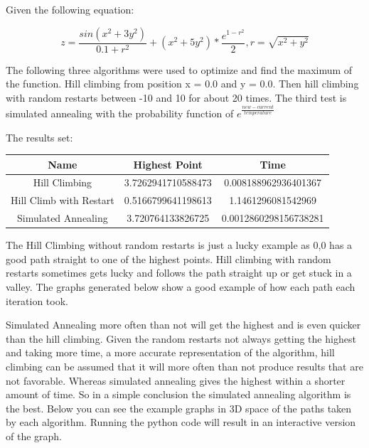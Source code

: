 \documentclass[letter,12pt]{article}
\begin{document}
\pagestyle{headings}

Given the following equation:

\begin{equation}
z = \frac{sin(x^2 + 3y^2)}{0.1+r^2}
+ (x^2 + 5y^2) * \frac{e^{1-r^2}}{2},
r = \sqrt{x^2+y^2}
\end{equation}

The following three algorithms were used to optimize and find the maximum of the function. Hill climbing from position x = 0.0 and y = 0.0. Then hill climbing with random restarts between -10 and 10 for about 20 times. The third test is simulated annealing with the probability function of $ e^{\frac{new-current}{temperature}} $

The results set:

\begin{center}
 \begin{tabular}{c c c}
 \hline
 Name & Highest Point & Time  \\ [0.5ex]
 \hline\hline
 Hill Climbing & 3.7262941710588473 & 0.008188962936401367  \\
 \hline
 Hill Climb with Restart & 0.5166799641198613 & 1.1461296081542969 \\
 \hline
 Simulated Annealing & 3.720764133826725 & 0.0012860298156738281 \\
 \hline
\end{tabular}
\end{center}

The Hill Climbing without random restarts is just a lucky example as 0,0 has a good path straight to one of the highest points. Hill climbing with random restarts sometimes gets lucky and follows the path straight up or get stuck in a valley. The graphs generated below show a good example of how each path each iteration took.

Simulated Annealing more often than not will get the highest and is even quicker than the hill climbing. Given the random restarts not always getting the highest and taking more time, a more accurate representation of the algorithm, hill climbing can be assumed that it will more often than not produce results that are not favorable. Whereas simulated annealing gives the highest within a shorter amount of time. So in a simple conclusion the simulated annealing algorithm is the best. Below you can see the example graphs in 3D space of the paths taken by each algorithm. Running the python code will result in an interactive version of the graph.
\end{document}
